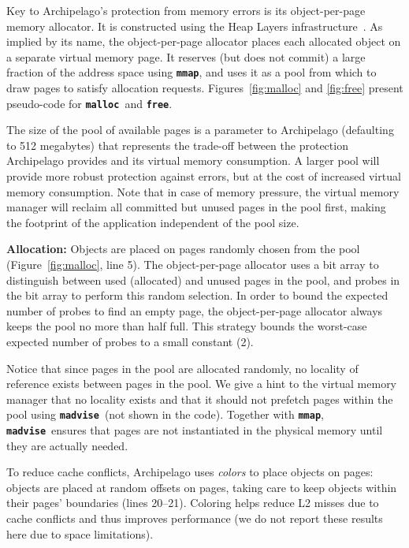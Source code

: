 \documentclass{acm_proc_article-sp}
\newcommand{\cfunction}[1]{{\bf \tt #1}}
\newcommand{\malloc}{\cfunction{malloc}}
\newcommand{\free}{\cfunction{free}}
\newcommand{\madvise}{\cfunction{madvise}}
\newcommand{\mmap}{\cfunction{mmap}}
\begin{document}
\noindent

Key to Archipelago's protection from memory errors is its
object-per-page memory allocator. It is constructed using the Heap
Layers infrastructure~\cite{BergerZornMcKinley:2001}. As implied by
its name, the object-per-page allocator places each allocated object
on a separate virtual memory page. It reserves (but does not commit) a
large fraction of the address space using \mmap, and uses it as a pool
from which to draw pages to satisfy allocation
requests. Figures~\ref{fig:malloc} and \ref{fig:free} present
pseudo-code for \malloc\ and \free.

The size of the pool of available pages is a parameter to Archipelago
(defaulting to 512 megabytes) that represents the trade-off between
the protection Archipelago provides and its virtual memory
consumption. A larger pool will provide more robust protection against
errors, but at the cost of increased virtual memory consumption. Note
that in case of memory pressure, the virtual memory manager will
reclaim all committed but unused pages in the pool first, making the
footprint of the application independent of the pool size. 

{\bf Allocation:} Objects are placed on pages randomly chosen from the
pool (Figure~\ref{fig:malloc}, line 5). The object-per-page allocator
uses a bit array to distinguish between used (allocated) and unused
pages in the pool, and probes in the bit array to perform this random
selection. In order to bound the expected number of probes to find an
empty page, the object-per-page allocator always keeps the pool no
more than half full. This strategy bounds the worst-case expected
number of probes to a small constant (2).

Notice that since pages in the pool are allocated randomly, no
locality of reference exists between pages in the pool. We give a hint
to the virtual memory manager that no locality exists and that it
should not prefetch pages within the pool using \madvise\ (not shown in
the code). Together with \mmap,
\madvise\ ensures that pages are not instantiated in the physical
memory until they are actually needed.

To reduce cache conflicts, Archipelago uses \emph{colors} to place
objects on pages: objects are placed at random offsets on pages,
taking care to keep objects within their pages' boundaries (lines
20--21). Coloring helps reduce L2 misses due to cache conflicts and
thus improves performance (we do not report these results here due to
space limitations).
\end{document}

